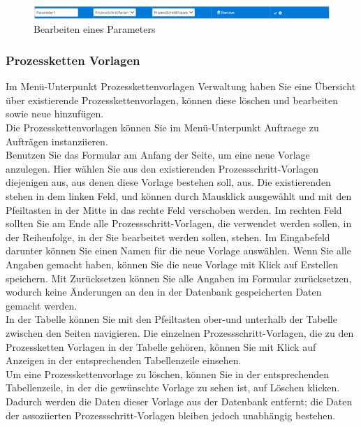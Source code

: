 \documentclass[enabledeprecatedfontcommands,fontsize=12pt,paper=a4,twoside]{scrartcl}
\begin{document}
\begin{figure}[h!]
\begin{center}
 \includegraphics[width=\textwidth]{screenshots/pk/parameterbearbeiten.png}
  \caption{Bearbeiten eines Parameters}
  \label{fig:boat2}
\end{center}
\end{figure}


\subsubsection{Prozessketten Vorlagen}

Im Menü-Unterpunkt Prozesskettenvorlagen Verwaltung haben Sie eine Übersicht über existierende Prozesskettenvorlagen, können diese löschen und bearbeiten sowie neue hinzufügen. \\

Die Prozesskettenvorlagen können Sie im Menü-Unterpunkt Auftraege zu Aufträgen instanziieren. \\

Benutzen Sie das Formular am Anfang der Seite, um eine neue Vorlage anzulegen. Hier wählen Sie aus den existierenden Prozessschritt-Vorlagen diejenigen aus, aus denen diese Vorlage bestehen soll, aus. Die existierenden stehen in dem linken Feld, und können durch Mausklick ausgewählt und mit den Pfeiltasten in der Mitte in das rechte Feld verschoben werden. Im rechten Feld sollten Sie am Ende alle Prozessschritt-Vorlagen, die verwendet werden sollen, in der Reihenfolge, in der Sie bearbeitet werden sollen, stehen. Im Eingabefeld darunter können Sie einen Namen für die neue Vorlage auswählen. Wenn Sie alle Angaben gemacht haben, können Sie die neue Vorlage mit Klick auf Erstellen speichern. Mit Zurücksetzen können Sie alle Angaben im Formular zurücksetzen, wodurch keine Änderungen an den in der Datenbank gespeicherten Daten gemacht werden. \\

In der Tabelle können Sie mit den Pfeiltasten ober-und unterhalb der Tabelle zwischen den Seiten navigieren. Die einzelnen Prozessschritt-Vorlagen, die zu den Prozessketten Vorlagen in der Tabelle gehören, können Sie mit Klick auf Anzeigen in der entsprechenden Tabellenzeile einsehen. \\

Um eine Prozesskettenvorlage zu löschen, können Sie in der entsprechenden Tabellenzeile, in der die gewünschte Vorlage zu sehen ist, auf Löschen klicken. Dadurch werden die Daten dieser Vorlage aus der Datenbank entfernt; die Daten der assoziierten Prozessschritt-Vorlagen bleiben jedoch unabhängig bestehen. \\
\end{document}
